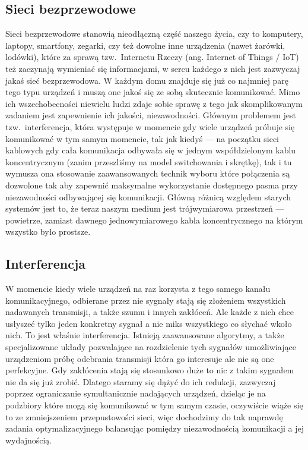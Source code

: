 \documentclass[11pt,a4paper,onecolumn,twoside]{mwart}
\begin{document}
\subsection{Sieci bezprzewodowe}
Sieci bezprzewodowe stanowią nieodłączną część naszego życia, czy to komputery,
laptopy, smartfony, zegarki, czy też dowolne inne urządzenia (nawet żarówki,
lodówki), które za sprawą tzw.\ Internetu Rzeczy (ang. Internet of Things / IoT)
też zaczynają wymieniać się informacjami, w sercu każdego z nich jest zazwyczaj
jakaś sieć bezprzewodowa. W każdym domu znajduje się już co najmniej parę tego
typu urządzeń i muszą one jakoś się ze sobą skutecznie komunikować. Mimo ich
wszechobecności niewielu ludzi zdaje sobie sprawę z tego jak skomplikowanym
zadaniem jest zapewnienie ich jakości, niezawodności. Głównym problemem jest
tzw.\ interferencja, która występuje w momencie gdy wiele urządzeń próbuje się
komunikować w tym samym momencie, tak jak kiedyś --- na początku sieci kablowych
gdy cała komunikacja odbywała się w jednym współdzielonym kablu koncentrycznym
(zanim przeszliśmy na model switchowania i skrętkę), tak i tu wymusza ona
stosowanie zaawansowanych technik wyboru które połączenia są dozwolone tak aby
zapewnić maksymalne wykorzystanie dostępnego pasma przy niezawodności
odbywającej się komunikacji. Główną różnicą względem starych systemów jest to,
że teraz naszym medium jest trójwymiarowa przestrzeń --- powietrze, zamiast
dawnego jednowymiarowego kabla koncentrycznego na którym wszystko było prostsze.

\subsection{Interferencja}
W momencie kiedy wiele urządzeń na raz korzysta z tego samego kanału
komunikacyjnego, odbierane przez nie sygnały stają się złożeniem wszystkich
nadawanych transmisji, a także szumu i innych zakłóceń. Ale każde z nich chce
usłyszeć tylko jeden konkretny sygnał a nie miks wszystkiego co słychać wkoło
nich. To jest właśnie interferencja. Istnieją zaawansowane algorytmy, a także
specjalizowane układy pozwalające na rozdzielenie tych sygnałów umożliwiające
urządzeniom próbę odebrania transmisji która go interesuje ale nie są one
perfekcyjne. Gdy zakłócenia stają się stosunkowo duże to nic z takim sygnałem
nie da się już zrobić. Dlatego staramy się dążyć do ich redukcji, zazwyczaj
poprzez ograniczanie symultanicznie nadających urządzeń, dzieląc je na podzbiory
które mogą się komunikować w tym samym czasie, oczywiście wiąże się to ze
zmniejszeniem przepustowości sieci, więc dochodzimy do tak naprawdę zadania
optymalizacyjnego balansując pomiędzy niezawodnością komunikacji a jej
wydajnością.
\end{document}
